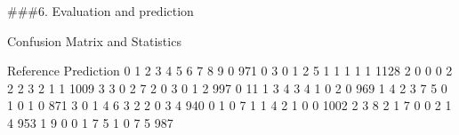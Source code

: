 \documentclass[10pt,ignorenonframetext,]{beamer}
\newenvironment{Shaded}{\begin{snugshade}}{\end{snugshade}}
\newcommand{\CommentTok}[1]{\textcolor[rgb]{0.56,0.35,0.01}{\textit{#1}}}
\newcommand{\DecValTok}[1]{\textcolor[rgb]{0.00,0.00,0.81}{#1}}
\newcommand{\KeywordTok}[1]{\textcolor[rgb]{0.13,0.29,0.53}{\textbf{#1}}}
\newcommand{\NormalTok}[1]{#1}
\newcommand{\OperatorTok}[1]{\textcolor[rgb]{0.81,0.36,0.00}{\textbf{#1}}}
\newcommand{\StringTok}[1]{\textcolor[rgb]{0.31,0.60,0.02}{#1}}
\begin{document}
\begin{frame}[fragile]

\#\#\#6. Evaluation and prediction

\scriptsize

\begin{Shaded}
\end{Shaded}

\begin{Shaded}
\begin{Highlighting}[]
\NormalTok{Confusion Matrix and Statistics}

\NormalTok{          Reference}
\NormalTok{Prediction    }\DecValTok{0}    \DecValTok{1}    \DecValTok{2}    \DecValTok{3}    \DecValTok{4}    \DecValTok{5}    \DecValTok{6}    \DecValTok{7}    \DecValTok{8}    \DecValTok{9}
         \DecValTok{0}  \DecValTok{971}    \DecValTok{0}    \DecValTok{3}    \DecValTok{0}    \DecValTok{1}    \DecValTok{2}    \DecValTok{5}    \DecValTok{1}    \DecValTok{1}    \DecValTok{1}
         \DecValTok{1}    \DecValTok{1} \DecValTok{1128}    \DecValTok{2}    \DecValTok{0}    \DecValTok{0}    \DecValTok{0}    \DecValTok{2}    \DecValTok{2}    \DecValTok{2}    \DecValTok{3}
         \DecValTok{2}    \DecValTok{1}    \DecValTok{1} \DecValTok{1009}    \DecValTok{3}    \DecValTok{3}    \DecValTok{0}    \DecValTok{2}    \DecValTok{7}    \DecValTok{2}    \DecValTok{0}
         \DecValTok{3}    \DecValTok{0}    \DecValTok{1}    \DecValTok{2}  \DecValTok{997}    \DecValTok{0}   \DecValTok{11}    \DecValTok{1}    \DecValTok{3}    \DecValTok{4}    \DecValTok{3}
         \DecValTok{4}    \DecValTok{1}    \DecValTok{0}    \DecValTok{2}    \DecValTok{0}  \DecValTok{969}    \DecValTok{1}    \DecValTok{4}    \DecValTok{2}    \DecValTok{3}    \DecValTok{7}
         \DecValTok{5}    \DecValTok{0}    \DecValTok{1}    \DecValTok{0}    \DecValTok{1}    \DecValTok{0}  \DecValTok{871}    \DecValTok{3}    \DecValTok{0}    \DecValTok{1}    \DecValTok{4}
         \DecValTok{6}    \DecValTok{3}    \DecValTok{2}    \DecValTok{2}    \DecValTok{0}    \DecValTok{3}    \DecValTok{4}  \DecValTok{940}    \DecValTok{0}    \DecValTok{1}    \DecValTok{0}
         \DecValTok{7}    \DecValTok{1}    \DecValTok{1}    \DecValTok{4}    \DecValTok{2}    \DecValTok{1}    \DecValTok{0}    \DecValTok{0} \DecValTok{1002}    \DecValTok{2}    \DecValTok{3}
         \DecValTok{8}    \DecValTok{2}    \DecValTok{1}    \DecValTok{7}    \DecValTok{0}    \DecValTok{0}    \DecValTok{2}    \DecValTok{1}    \DecValTok{4}  \DecValTok{953}    \DecValTok{1}
         \DecValTok{9}    \DecValTok{0}    \DecValTok{0}    \DecValTok{1}    \DecValTok{7}    \DecValTok{5}    \DecValTok{1}    \DecValTok{0}    \DecValTok{7}    \DecValTok{5}  \DecValTok{987}


\end{Highlighting}
\end{Shaded}
\end{frame}
\end{document}
